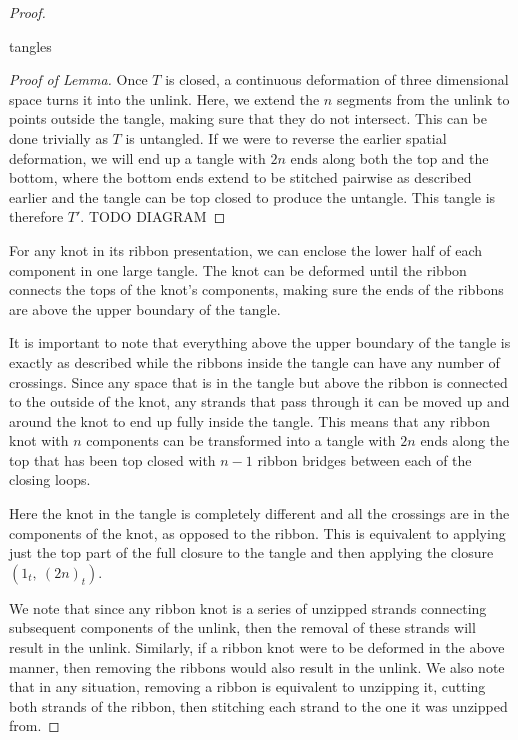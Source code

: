 \begin{paper}
\begin{proof}
\begin{paperlemma}{tangles}

\end{paperlemma}
\begin{proof}[Proof of Lemma]
Once $T$ is closed, a continuous deformation of three dimensional space turns it
into the unlink.
Here, we extend the $n$ segments from the unlink to points outside the tangle,
making sure that they do not intersect.
This can be done trivially as $T$ is untangled.
If we were to reverse the earlier spatial deformation, we will end up a tangle
with $2n$ ends along both the top and the bottom, where the bottom ends extend
to be stitched pairwise as described earlier and the tangle can be top closed to
produce the untangle.
This tangle is therefore $T'$.
TODO DIAGRAM
\end{proof}
For any knot in its ribbon presentation, we can enclose the lower half of each
component in one large tangle.
The knot can be deformed until the ribbon connects the tops of the knot's
components, making sure the ends of the ribbons are above the upper boundary of
the tangle.


It is important to note that everything above the upper boundary of the tangle
is exactly as described while the ribbons inside the tangle can have any number
of crossings.
Since any space that is in the tangle but above the ribbon is connected to the
outside of the knot, any strands that pass through it can be moved up and around
the knot to end up fully inside the tangle.
This means that any ribbon knot with $n$ components can be transformed into a
tangle with $2n$ ends along the top that has been top closed with $n-1$ ribbon
bridges between each of the closing loops.


Here the knot in the tangle is completely different and all the crossings are in
the components of the knot, as opposed to the ribbon.
This is equivalent to applying just the top part of the full closure to the
tangle and then applying the closure $(1_t,~(2n)_t)$.


We note that since any ribbon knot is a series of unzipped strands connecting
subsequent components of the unlink, then the removal of these strands will
result in the unlink.
Similarly, if a ribbon knot were to be deformed in the above manner, then
removing the ribbons would also result in the unlink.
We also note that in any situation, removing a ribbon is equivalent to unzipping
it, cutting both strands of the ribbon, then stitching each strand to the one it
was unzipped from.


\end{proof}
\end{paper}
